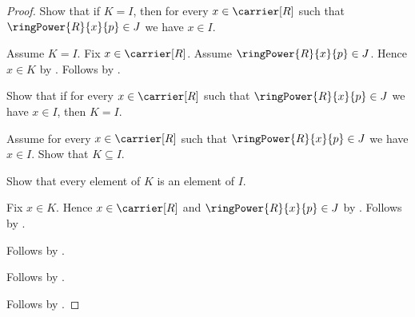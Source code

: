 \begin{proof}
    Show that if $K=I$, then for every $x\in\carrier[R]$ such that
        $\ringPower{R}{x}{p}\in J$ we have $x\in I$.
    \begin{subproof}
        Assume $K=I$.
        Fix $x\in\carrier[R]$.
        Assume $\ringPower{R}{x}{p}\in J$.
        Hence $x\in K$ by \auto.
        Follows by \auto.
    \end{subproof}
    Show that if for every $x\in\carrier[R]$ such that
            $\ringPower{R}{x}{p}\in J$ we have $x\in I$,
        then $K=I$.
    \begin{subproof}
        Assume for every $x\in\carrier[R]$ such that
            $\ringPower{R}{x}{p}\in J$ we have $x\in I$.
        Show that $K\subseteq I$.
        \begin{subproof}
            Show that every element of $K$ is an element of $I$.
            \begin{subproof}
                Fix $x\in K$.
                Hence $x\in\carrier[R]$ and
                    $\ringPower{R}{x}{p}\in J$ by \auto.
                Follows by \auto.
            \end{subproof}
            Follows by .
        \end{subproof}
        Follows by .
    \end{subproof}
    Follows by \auto.
\end{proof}


